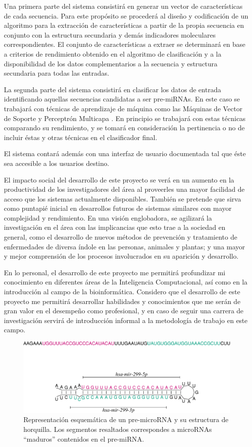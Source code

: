 \documentclass[bibliography=openstyle,DIV=12]{scrartcl}
\begin{document}
Una primera parte del sistema consistirá en generar un vector de características de cada secuencia. Para este propósito se procederá al diseño y codificación de un algoritmo para la extracción de características a partir de la propia secuencia en conjunto con la estructura secundaria y demás indicadores moleculares correspondientes. El conjunto de características a extraer se determinará en base a criterios de rendimiento obtenido en el algoritmo de clasificación y a la disponibilidad de los datos complementarios a la secuencia y estructura secundaria para todas las entradas.

La segunda parte del sistema consistirá en clasificar los datos de entrada identificando aquellas secuencias candidatas a ser pre-miRNAs. En este caso se trabajará con técnicas de aprendizaje de máquina como las Máquinas de Vector de Soporte \cite{CITA} y Perceptrón Multicapa \cite{CITA}. En principio se trabajará con estas técnicas comparando su rendimiento, y se tomará en consideración la pertinencia o no de incluir éstas y otras técnicas en el clasificador final.

El sistema contará además con una interfaz de usuario documentada tal que éste sea accesible a los usuarios destino.

El impacto social del desarrollo de este proyecto se verá en un aumento en la productividad de los investigadores del área al proveerles una mayor facilidad de acceso que los sistemas actualmente disponibles. También se pretende que sirva como puntapié inicial en desarrollos futuros de sistemas similares con mayor complejidad y rendimiento. En una visión englobadora, se agilizará la investigación en el área con las implicancias que esto trae a la sociedad en general, como el desarrollo de nuevos métodos de prevención y tratamiento de enfermedades de diversa índole en las personas, animales y plantas; y una mayor y mejor comprensión de los procesos involucrados en su aparición y desarrollo.

En lo personal, el desarrollo de este proyecto me permitirá profundizar mi conocimiento en diferentes áreas de la Inteligencia Computacional, así como en la introducción al campo de la bioinformática. Considero que el desarrollo de este proyecto me permitirá desarrollar habilidades y conocimientos que me serán de gran valor en el desempeño como profesional, y en caso de seguir una carrera de investigación servirá de introducción informal a la metodología de trabajo en este campo.
\begin{figure}
  \center
  \includegraphics[width=.9\textwidth]{img/hsa-mir-299_ss.pdf}
  \caption{Representación esquemática de un pre-microRNA y su estructura de horquilla. Los segmentos resaltados correspondes a microRNAs ``maduros'' contenidos en el pre-miRNA.}  
\end{figure}
%
\end{document}
